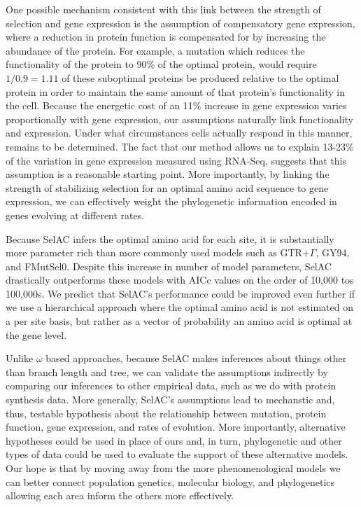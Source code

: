 \documentclass[12pt,letterpaper]{article}
\newcommand{\selac}{SelAC\xspace}
\begin{document}
One possible mechanism consistent with this link between the strength of selection and gene expression is the assumption of compensatory gene expression, where a reduction in protein function is compensated for by increasing the abundance of the protein.
For example, a mutation which reduces the functionality of the protein to 90\% of the optimal protein, would require $1/0.9 = 1.11$ of these suboptimal proteins be produced relative to the optimal protein in order to maintain the same amount of that protein's functionality in the cell.
Because the energetic cost of an 11\% increase in gene expression varies proportionally with gene expression, our assumptions naturally link functionality and expression.
Under what circumstances cells actually respond in this manner, remains to be determined.
The fact that our method allows us to explain 13-23\% of the variation in gene expression measured using RNA-Seq, suggests that this assumption is a reasonable starting point.
More importantly, by linking the strength of stabilizing selection for an optimal amino acid sequence to gene expression, we can effectively weight the phylogenetic information encoded in genes evolving at different rates.



Because \selac infers the optimal amino acid for each site, it is substantially more parameter rich than more commonly used models such as GTR$+\Gamma$, GY94, and FMutSel0.
Despite this increase in number of model parameters, \selac drastically outperforms these models with AICc values on the order of 10,000 tos 100,000s.
We predict that \selac's performance could be improved even further if we use a hierarchical approach where the optimal amino acid is not estimated on a per site basis, but rather as a vector of probability an amino acid is optimal at the gene level.

Unlike $\omega$ based approaches, because \selac makes inferences about things other than branch length and tree, we can validate the assumptions indirectly by comparing our inferences to other empirical data, such as we do with  protein synthesis data.
More generally, \selac's assumptions lead to mechanstic and, thus, testable hypothesis about the relationship between mutation, protein function, gene expression, and rates of evolution.
More importantly, alternative hypotheses could be used in place of ours and, in turn, phylogenetic and other types of data could be used to evaluate the support of these alternative models.
Our hope is that by moving away from the more phenomenological models we can better connect population genetics, molecular biology, and phylogenetics allowing each area inform the others more effectively.
\end{document}
